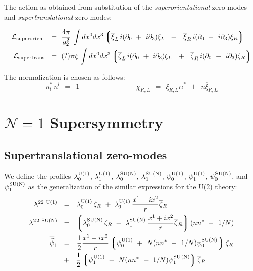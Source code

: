 \documentclass{article}
\newcommand{\p}{\partial}
\newcommand{\wt}{\widetilde}
\newcommand{\ov}{\overline}
\newcommand{\mc}[1]{\mathcal{#1}}
\newcommand{\lgr}{\left\lgroup}
\newcommand{\rgr}{\right\rgroup}
\begin{document}
\pagebreak
	The action as obtained from substitution of the {\it superorientational} zero-modes and
	{\it supertranslational} zero-modes:

\begin{align*}
%
\mc{L}_{\rm superorient} ~~=~~ &
	\frac{4\pi}{g_2^2}\,
	\int dx^0 dx^3 
	\left\lgroup 
	\ov{\xi}_L \, i (\p_0 ~+~ i \p_3 ) \xi_L ~~+~~ \ov{\xi}_R \, i (\p_0 ~-~ i \p_3 ) \xi_R 
	\right\rgroup 
	\\
%
\mc{L}_{\rm supertrans} ~~=~~ &
	(?) \pi \xi\,
	\int dx^0 dx^3
	\lgr
		\ov{\zeta}_L \, i (\p_0 ~+~ i \p_3 ) \zeta_L ~~+~~ 
		\ov{\zeta}_R \, i (\p_0 ~-~ i \p_3 ) \zeta_R 
	\rgr
\end{align*}

The normalization is chosen as follows:
\[
	n^{*}_l \, n^l ~~=~~ 1 \qquad\qquad\qquad\qquad \chi_{R,L} ~~=~~ \xi_{R,L} n^* ~~+~~ n \ov{\xi}_{R,L}
\]


\pagebreak

\section{$\mathcal{N}=1$ Supersymmetry}

\subsection{Supertranslational zero-modes}
\newcommand{\loU}{\lambda_0^{\rm U(1)}}
\newcommand{\llU}{\lambda_1^{\rm U(1)}}
\newcommand{\loN}{\lambda_0^{\rm SU(N)}}
\newcommand{\llN}{\lambda_1^{\rm SU(N)}}
\newcommand{\poU}{\psi_0^{\rm U(1)}}
\newcommand{\plU}{\psi_1^{\rm U(1)}}
\newcommand{\poN}{\psi_0^{\rm SU(N)}}
\newcommand{\plN}{\psi_1^{\rm SU(N)}}

We define the profiles $ \loU $, $ \llU $, $ \loN $, $ \llN $, $ \poU $, $ \plU $, $ \poN $, and $ \plN $ 
as the generalization of the similar expressions for the U(2) theory:
\begin{align*}
%
	\lambda^{22\ \rm U(1)} & ~~=~~ \loU\, \zeta_R ~+~ \llU\, \frac{x^1 + i x^2}{r} \ov{\zeta}{}_R 
	\\
%
	\lambda^{22\ \rm SU(N)} & ~~=~~ \lgr  \loN\, \zeta_R ~+~ \llN\, \frac{x^1 + i x^2}{r} \ov{\zeta}{}_R \rgr
					( nn^* ~-~ 1/N )
	\\
%
	\ov{\wt{\psi}}{}_{\dot{1}} & ~~=~~ \frac{1}{2} \frac{x^1 - i x^2}{r}
				\lgr  \poU ~+~ N (nn^* ~-~ 1/N) \poN \rgr \zeta_R \\
				   & 
				~~+~~ \frac{1}{2} \lgr  \plU  ~+~ N (nn^* ~-~ 1/N) \plN \rgr  \ov{\zeta}{}_R
\end{align*}
\end{document}

